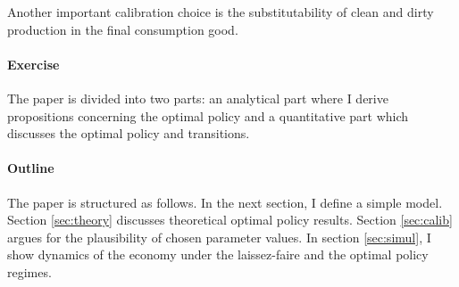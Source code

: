 Another important calibration choice is the substitutability of clean and dirty production in the final consumption good.

\paragraph{Exercise}
The paper is divided into two parts: an analytical part where I derive propositions concerning the optimal policy and a quantitative part which discusses the optimal policy and transitions. 

\paragraph{Outline}
The paper is structured as follows. In the next section, I define a simple model. %
Section \ref{sec:theory} discusses theoretical optimal policy results. Section \ref{sec:calib} argues for the plausibility of chosen parameter values. In section \ref{sec:simul}, I show dynamics of the economy under the laissez-faire and the optimal policy regimes. 


